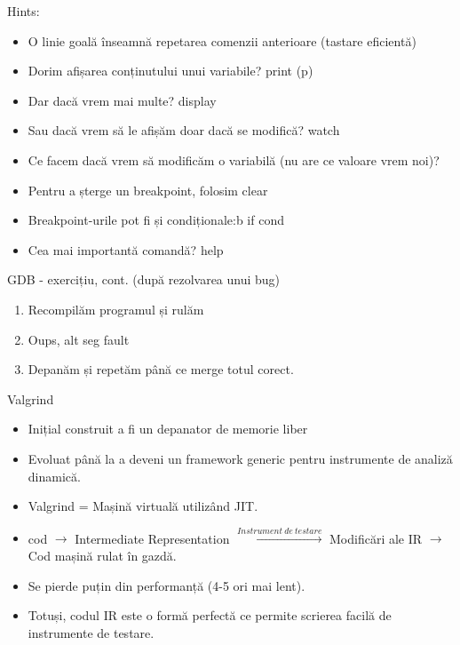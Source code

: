 \documentclass{beamer}
\begin{document}
\begin{frame}{Hints:}
\begin{itemize}
\item O linie goală înseamnă repetarea comenzii anterioare (tastare eficientă)
\item \pause Dorim afișarea conținutului unui variabile? print (p)
\item \pause Dar dacă vrem mai multe? display
\item \pause Sau dacă vrem să le afișăm doar dacă se modifică? watch
\item \pause Ce facem dacă vrem să modificăm o variabilă (nu are ce valoare vrem noi)?  
\item \pause Pentru a șterge un breakpoint, folosim clear
\item \pause Breakpoint-urile pot fi și condiționale:\linebreak b if cond
\item \pause Cea mai importantă comandă? \pause help
\end{itemize}
\end{frame}

\begin{frame}{GDB - exercițiu, cont. (după rezolvarea unui bug)}
\begin{enumerate}
\item Recompilăm programul și rulăm
\item \pause Oups, alt seg fault
\item \pause Depanăm și repetăm până ce merge totul corect.
\end{enumerate}
\end{frame}

\begin{frame}{Valgrind}
\begin{itemize}
\item Inițial construit a fi un depanator de memorie liber
\item \pause Evoluat până la a deveni un framework generic pentru instrumente de analiză dinamică.
\item \pause Valgrind = Mașină virtuală utilizând JIT.
\item \pause cod \pause$\rightarrow$ Intermediate Representation \pause$\xrightarrow{Instrument\ de\ testare}$ Modificări ale IR \pause$\rightarrow$ Cod mașină rulat în gazdă.
\item \pause Se pierde puțin din performanță \pause(4-5 ori mai lent).
\item \pause Totuși, codul IR este o formă perfectă ce permite scrierea facilă de instrumente de testare.
\end{itemize}
\end{frame}
\end{document}
